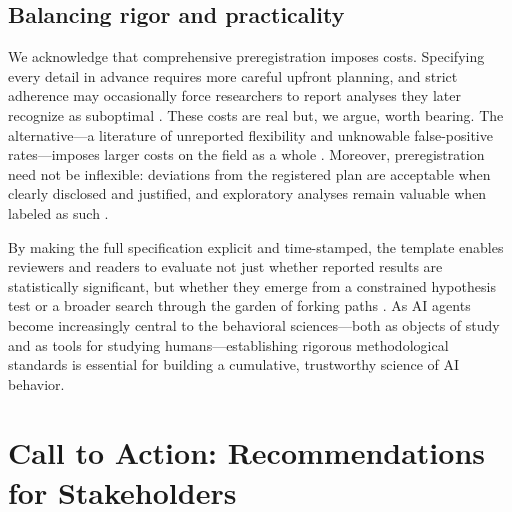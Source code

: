 \documentclass{article}
\theoremstyle{plain}
\theoremstyle{definition}
\theoremstyle{remark}
\begin{document}
\subsection{Balancing rigor and practicality}

We acknowledge that comprehensive preregistration imposes costs. Specifying every detail in advance requires more careful upfront planning, and strict adherence may occasionally force researchers to report analyses they later recognize as suboptimal \citep{nosek2018preregistration}. These costs are real but, we argue, worth bearing. The alternative---a literature of unreported flexibility and unknowable false-positive rates---imposes larger costs on the field as a whole \citep{simmons2011falsepositive}. Moreover, preregistration need not be inflexible: deviations from the registered plan are acceptable when clearly disclosed and justified, and exploratory analyses remain valuable when labeled as such \citep{chambers2013registeredreports,wagenmakers2012agenda}.

By making the full specification explicit and time-stamped, the template enables reviewers and readers to evaluate not just whether reported results are statistically significant, but whether they emerge from a constrained hypothesis test or a broader search through the garden of forking paths \citep{gelman2013forkingpaths}. As AI agents become increasingly central to the behavioral sciences---both as objects of study and as tools for studying humans---establishing rigorous methodological standards is essential for building a cumulative, trustworthy science of AI behavior.

\section{Call to Action: Recommendations for Stakeholders}\label{sec:call}
\end{document}
